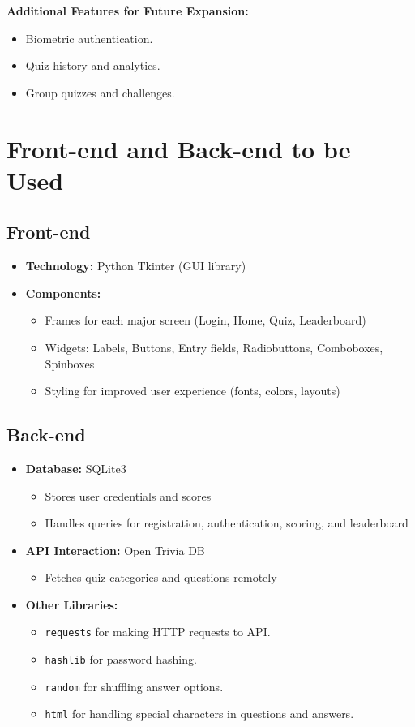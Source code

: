 \documentclass[12pt,a4paper]{article}
\begin{document}
\textbf{Additional Features for Future Expansion:}
\begin{itemize}
    \item Biometric authentication.
    \item Quiz history and analytics.
    \item Group quizzes and challenges.
\end{itemize}

\section{Front-end and Back-end to be Used}

\subsection*{Front-end}
\begin{itemize}
    \item \textbf{Technology:} Python Tkinter (GUI library)
    \item \textbf{Components:}
    \begin{itemize}
        \item Frames for each major screen (Login, Home, Quiz, Leaderboard)
        \item Widgets: Labels, Buttons, Entry fields, Radiobuttons, Comboboxes, Spinboxes
        \item Styling for improved user experience (fonts, colors, layouts)
    \end{itemize}
\end{itemize}

\subsection*{Back-end}
\begin{itemize}
    \item \textbf{Database:} SQLite3
    \begin{itemize}
        \item Stores user credentials and scores
        \item Handles queries for registration, authentication, scoring, and leaderboard
    \end{itemize}
    \item \textbf{API Interaction:} Open Trivia DB
    \begin{itemize}
        \item Fetches quiz categories and questions remotely
    \end{itemize}
    \item \textbf{Other Libraries:}
    \begin{itemize}
        \item \texttt{requests} for making HTTP requests to API.
        \item \texttt{hashlib} for password hashing.
        \item \texttt{random} for shuffling answer options.
        \item \texttt{html} for handling special characters in questions and answers.
    \end{itemize}
\end{itemize}
\end{document}
